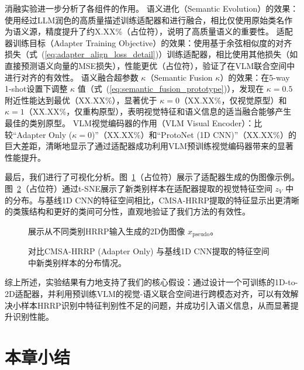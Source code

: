 消融实验进一步分析了各组件的作用。
语义进化（Semantic Evolution）的效果：使用经过LLM润色的高质量描述训练适配器和进行融合，相比仅使用原始类名作为语义源，精度提升了约X.XX\%（占位符），说明了高质量语义的重要性。
适配器训练目标（Adapter Training Objective）的效果：使用基于余弦相似度的对齐损失（式~(\ref{eq:adapter_align_loss_detail})）训练适配器，相比使用其他损失（如直接预测语义向量的MSE损失），性能更优（占位符），验证了在VLM联合空间中进行对齐的有效性。
语义融合超参数 $\kappa$（Semantic Fusion $\kappa$）的效果：在5-way 1-shot设置下调整 $\kappa$ 值（式~(\ref{eq:semantic_fusion_prototype})），发现在 $\kappa=0.5$ 附近性能达到最优（XX.XX\%），显著优于 $\kappa=0$（XX.XX\%，仅视觉原型）和 $\kappa=1$（XX.XX\%，仅重构原型），表明视觉特征和语义信息的适当融合能够产生最佳的类别原型。
VLM视觉编码器的作用（VLM Visual Encoder）：比较“Adapter Only ($\kappa=0$)”（XX.XX\%）和“ProtoNet (1D CNN)”（XX.XX\%）的巨大差距，清晰地显示了通过适配器成功利用VLM预训练视觉编码器带来的显著性能提升。

最后，我们进行了可视化分析。图~\ref{fig:pseudo_images_semantic}（占位符）展示了适配器生成的伪图像示例。图~\ref{fig:tsne_adapter_semantic}（占位符）通过t-SNE展示了新类别样本在适配器提取的视觉特征空间 $z_V$ 中的分布。与基线1D CNN的特征空间相比，CMSA-HRRP提取的特征显示出更清晰的类簇结构和更好的类间可分性，直观地验证了我们方法的有效性。

\begin{figure}[h!]
    \centering
    \caption{展示从不同类别HRRP输入生成的2D伪图像 $x_{\text{pseudo}}$。}
    \label{fig:pseudo_images_semantic}
\end{figure}

\begin{figure}[h!]
    \centering
    \caption{对比CMSA-HRRP (Adapter Only) 与基线1D CNN提取的特征空间中新类别样本的分布情况。}
    \label{fig:tsne_adapter_semantic}
\end{figure}

综上所述，实验结果有力地支持了我们的核心假设：通过设计一个可训练的1D-to-2D适配器，并利用预训练VLM的视觉-语义联合空间进行跨模态对齐，可以有效解决小样本HRRP识别中特征判别性不足的问题，并成功引入语义信息，从而显著提升识别性能。

\section{本章小结}
\label{sec:semantic_summary}

